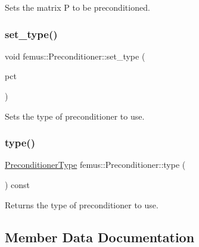 Sets the matrix P to be preconditioned. \mbox{\label{classfemus_1_1_preconditioner_a36dfaa704ced285ca06790eecc539739}} 
\subsubsection{\texorpdfstring{set\+\_\+type()}{set\_type()}}
{\footnotesize\ttfamily void femus\+::\+Preconditioner\+::set\+\_\+type (\begin{DoxyParamCaption}\item[{const \mbox{\hyperlink{_precondtype_enum_8hpp_a8b341faac6531c4543c9dc6e5e4592cf}{Preconditioner\+Type}}}]{pct }\end{DoxyParamCaption})\hspace{0.3cm}{\ttfamily [inline]}}

Sets the type of preconditioner to use. \mbox{\label{classfemus_1_1_preconditioner_a362032c26bed3a570fe8f55e17b99f61}} 
\subsubsection{\texorpdfstring{type()}{type()}}
{\footnotesize\ttfamily \mbox{\hyperlink{_precondtype_enum_8hpp_a8b341faac6531c4543c9dc6e5e4592cf}{Preconditioner\+Type}} femus\+::\+Preconditioner\+::type (\begin{DoxyParamCaption}{ }\end{DoxyParamCaption}) const\hspace{0.3cm}{\ttfamily [inline]}}

Returns the type of preconditioner to use. 

\subsection{Member Data Documentation}
\mbox{\label{classfemus_1_1_preconditioner_afdceb4cdb6af1ec7a6da92987d98305d}} 
